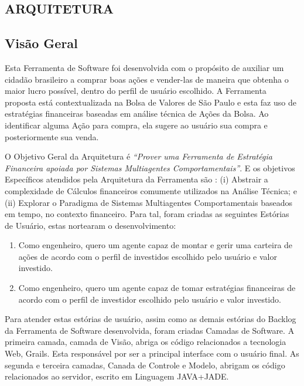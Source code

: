 \begin{apendicesenv}
\section{ARQUITETURA}
\subsection{Visão Geral}

Esta Ferramenta de Software foi desenvolvida com o propósito de auxiliar um cidadão brasileiro a comprar boas ações e vender-las de maneira que obtenha o maior lucro possível, dentro do perfil de usuário escolhido. A Ferramenta proposta está contextualizada na Bolsa de Valores de São Paulo e esta faz uso de estratégias financeiras baseadas em análise técnica de Ações da Bolsa. Ao identificar alguma Ação para compra, ela sugere ao usuário sua compra e posteriormente sua venda. 

O Objetivo Geral da Arquitetura é \textit{“Prover uma Ferramenta de Estratégia Financeira apoiada por Sistemas Multiagentes Comportamentais”}. E os objetivos Específicos atendidos pela Arquitetura da Ferramenta são : (i) Abstrair a complexidade de Cálculos financeiros comumente utilizados na Análise Técnica; e (ii) Explorar o Paradigma de Sistemas Multiagentes Comportamentais baseados em tempo, no contexto financeiro. Para tal, foram criadas as seguintes Estórias de Usuário, estas nortearam o desenvolvimento:

\begin{enumerate}

	\item Como engenheiro, quero um agente capaz de montar e gerir uma carteira de ações de acordo com o perfil de investidos escolhido pelo usuário e valor investido. 
	\item Como engenheiro, quero um agente capaz de tomar estratégias financeiras de acordo com o perfil de investidor escolhido pelo usuário e valor investido.
\end{enumerate}

Para atender estas estórias de usuário, assim como as demais estórias do Backlog da Ferramenta de Software desenvolvida, foram criadas Camadas de Software. A primeira camada, camada de Visão, abriga os código relacionados a tecnologia Web, Grails. Esta responsável por ser a principal interface com o usuário final. As segunda  e terceira camadas, Canada de Controle e Modelo, abrigam os código relacionados ao servidor, escrito em Linguagem JAVA+JADE. 


\end{apendicesenv}
